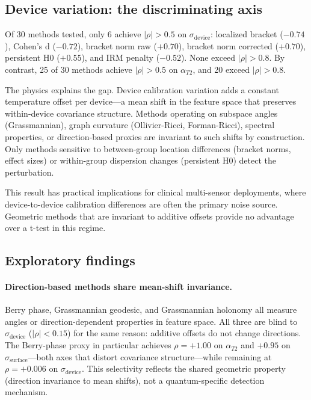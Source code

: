 \documentclass[11pt]{article}
\begin{document}
\subsection{Device variation: the discriminating axis}

Of 30 methods tested, only 6 achieve $|\rho| > 0.5$ on
$\sigma_\text{device}$: localized bracket ($-0.74$), Cohen's d
($-0.72$), bracket norm raw ($+0.70$), bracket norm corrected
($+0.70$), persistent H0 ($+0.55$), and IRM penalty ($-0.52$).
None exceed $|\rho| > 0.8$.
By contrast, 25 of 30 methods achieve $|\rho| > 0.5$ on
$\alpha_{T2}$, and 20 exceed $|\rho| > 0.8$.

The physics explains the gap.  Device calibration variation adds a
constant temperature offset per device---a mean shift in the feature
space that preserves within-device covariance structure.  Methods
operating on subspace angles (Grassmannian), graph curvature
(Ollivier-Ricci, Forman-Ricci), spectral properties, or
direction-based proxies are invariant to such shifts by construction.
Only methods sensitive to between-group location differences
(bracket norms, effect sizes) or within-group dispersion changes
(persistent H0) detect the perturbation.

This result has practical implications for clinical multi-sensor
deployments, where device-to-device calibration differences are often
the primary noise source.  Geometric methods that are invariant to
additive offsets provide no advantage over a t-test in this regime.

\subsection{Exploratory findings}

\paragraph{Direction-based methods share mean-shift invariance.}
Berry phase, Grassmannian geodesic, and Grassmannian holonomy all
measure angles or direction-dependent properties in feature space.
All three are blind to $\sigma_\text{device}$ ($|\rho| < 0.15$) for
the same reason: additive offsets do not change directions.  The
Berry-phase proxy in particular achieves $\rho = +1.00$ on
$\alpha_{T2}$ and $+0.95$ on $\sigma_\text{surface}$---both axes
that distort covariance structure---while remaining at $\rho = +0.006$
on $\sigma_\text{device}$.  This selectivity reflects the shared
geometric property (direction invariance to mean shifts), not a
quantum-specific detection mechanism.
\end{document}
